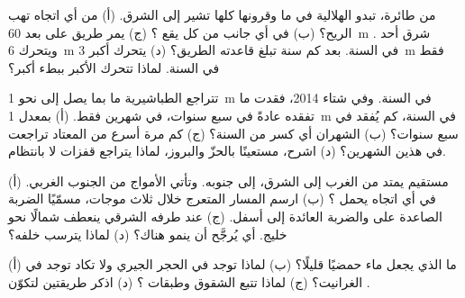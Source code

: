 \begin{exercise}[$\star\star$]\label{exo:g9:landforms:5}
من طائرة، تبدو  الهلالية في  ما وقرونها كلها تشير إلى
الشرق. (أ) من أي اتجاه تهب الريح؟ (ب) في أي جانب من كل  يقع ؟ (ج) يمر طريق على بعد \qty{60}{m} شرق أحد . ويتحرك
 \qty{6}{m} في السنة. بعد كم سنة تبلغ قاعدته الطريق؟ (د) يتحرك
 أكبر \qty{3}{m} فقط في السنة. لماذا تتحرك  الأكبر ببطء
أكبر؟
\end{exercise}

\begin{exercise}[$\star\star$]\label{exo:g9:landforms:6}
تتراجع  الطباشيرية  ما بما يصل إلى نحو \qty{1}{m} في السنة.
وفي شتاء 2014، فقدت ما تفقده عادةً في سبع سنوات، في شهرين فقط.
(أ) بمعدل \qty{1}{m} في السنة، كم يُفقد في سبع سنوات؟ (ب) الشهران أي
كسر من السنة؟ (ج) كم مرة أسرع من المعتاد تراجعت  في هذين الشهرين؟
(د) اشرح، مستعينًا بالحزّ والبروز، لماذا يتراجع  قفزات لا
بانتظام.
\end{exercise}

\begin{exercise}[$\star\star$]\label{exo:g9:landforms:7}
 مستقيم يمتد من الغرب إلى الشرق،  إلى جنوبه. وتأتي الأمواج من
الجنوب الغربي. (أ) في أي اتجاه يحمل  ؟ (ب) ارسم
المسار المتعرج  خلال ثلاث موجات، مسمّيًا الضربة الصاعدة على 
والضربة العائدة إلى أسفل. (ج) عند طرفه الشرقي ينعطف  شمالًا نحو
خليج. أي  يُرجَّح أن ينمو هناك؟ (د) لماذا يترسب 
خلفه؟
\end{exercise}

\begin{exercise}[$\star\star$]\label{exo:g9:landforms:8}
(أ) ما الذي يجعل ماء  حمضيًا قليلًا؟ (ب) لماذا توجد  في الحجر
الجيري ولا تكاد توجد في الغرانيت؟ (ج) لماذا تتبع  الشقوق وطبقات
؟ (د) اذكر طريقتين لتكوّن .
\end{exercise}

